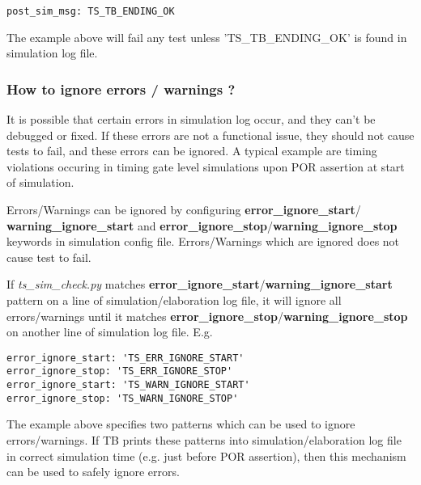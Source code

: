 \documentclass{tropic_design_spec}
\begin{document}
\begin{lstlisting}
post_sim_msg: TS_TB_ENDING_OK
\end{lstlisting}

The example above will fail any test unless 'TS_TB_ENDING_OK' is found in simulation
log file.


\subsubsection{How to ignore errors / warnings ?}
\label{sec:how-to-ignore-errors-warnigns}

It is possible that certain errors in simulation log occur, and they can't be debugged or
fixed. If these errors are not a functional issue, they should not cause tests to fail,
and these errors can be ignored. A typical example are timing violations occuring in
timing gate level simulations upon POR assertion at start of simulation.

Errors/Warnings can be ignored by configuring \textbf{error_ignore_start}/
\textbf{warning_ignore_start} and \textbf{error_ignore_stop}/\textbf{warning_ignore_stop}
keywords in simulation config file. Errors/Warnings which are ignored does not cause
test to fail.

If \textit{ts_sim_check.py} matches \textbf{error_ignore_start}/\textbf{warning_ignore_start}
pattern on a line of simulation/elaboration log file, it will ignore all errors/warnings
until it matches \textbf{error_ignore_stop}/\textbf{warning_ignore_stop} on another line
of simulation log file. E.g.

\begin{lstlisting}
error_ignore_start: 'TS_ERR_IGNORE_START'
error_ignore_stop: 'TS_ERR_IGNORE_STOP'
error_ignore_start: 'TS_WARN_IGNORE_START'
error_ignore_stop: 'TS_WARN_IGNORE_STOP'
\end{lstlisting}

The example above specifies two patterns which can be used to ignore errors/warnings.
If TB prints these patterns into simulation/elaboration log file in correct simulation time (e.g.
just before POR assertion), then this mechanism can be used to safely ignore errors.

\end{document}
